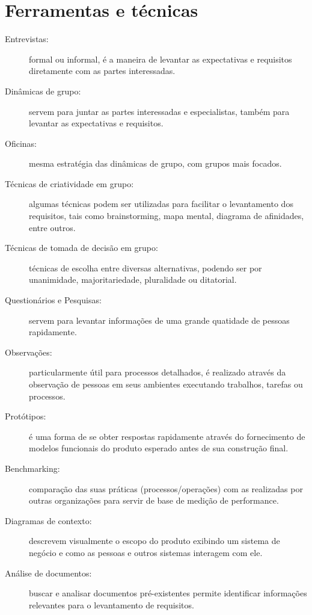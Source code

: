 \section{Ferramentas e técnicas}

\begin{description}
	
	\item[Entrevistas:] formal ou informal, é a maneira de levantar as expectativas e requisitos diretamente com as partes interessadas.
	
	\item[Dinâmicas de grupo:] servem para juntar as partes interessadas e especialistas, também para levantar as expectativas e requisitos.
	
	\item[Oficinas:] mesma estratégia das dinâmicas de grupo, com grupos mais focados.
	
	\item[Técnicas de criatividade em grupo:] algumas técnicas podem ser utilizadas para facilitar o levantamento dos requisitos, tais como brainstorming, mapa mental, diagrama de afinidades, entre outros.
	
	\item[Técnicas de tomada de decisão em grupo:] técnicas de escolha entre diversas alternativas, podendo ser por unanimidade, majoritariedade, pluralidade ou ditatorial.
	
	\item[Questionários e Pesquisas:] servem para levantar informações de uma grande quatidade de pessoas rapidamente.
	
	\item[Observações:] particularmente útil para processos detalhados, é realizado através da observação de pessoas em seus ambientes executando trabalhos, tarefas ou processos.
	
	\item[Protótipos:] é uma forma de se obter respostas rapidamente através do fornecimento de modelos funcionais do produto esperado antes de sua construção final.
	
	\item[Benchmarking:] comparação das suas práticas (processos/operações) com as realizadas por outras organizações para servir de base de medição de performance.
	
	\item[Diagramas de contexto:] descrevem visualmente o escopo do produto exibindo um sistema de negócio e como as pessoas e outros sistemas interagem com ele.
	
	\item[Análise de documentos:] buscar e analisar documentos pré-existentes permite identificar informações relevantes para o levantamento de requisitos.
		
\end{description}

